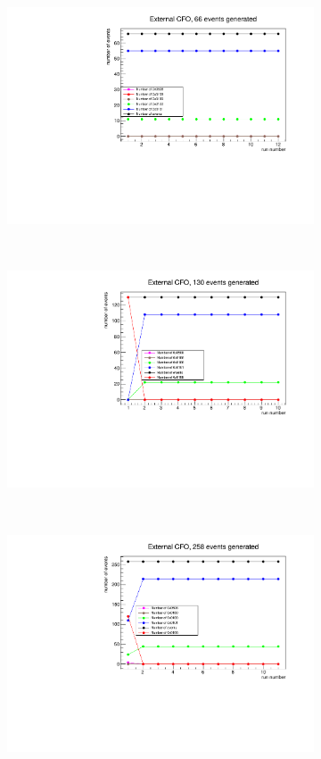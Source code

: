 \begin{figure}[!h]
  \centering
  \begin{subfigure}[t]{0.5\textwidth}
      \centering
      \includegraphics[width=1.1\textwidth]{figures/pdf/66.pdf}
      \caption{}
  \end{subfigure}%
  ~ 
  \begin{subfigure}[t]{0.5\textwidth}
      \centering
      \includegraphics[width=1.1\textwidth]{figures/pdf/130.pdf}
      \caption{}
  \end{subfigure}
  ~ 
  \begin{subfigure}[t]{0.5\textwidth}
    \centering
    \includegraphics[width=1.1\textwidth]{figures/pdf/258.pdf}

\end{subfigure}
\end{figure}
